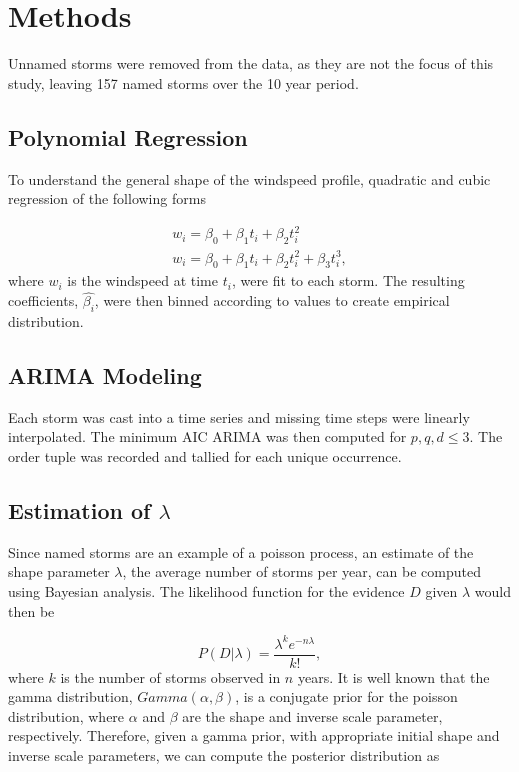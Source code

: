 \documentclass{article}
\begin{document}
	\section{Methods}	 
	 Unnamed storms were removed from the data, as they are not the focus of this study, leaving 157 named storms over the 10 year period. 

	\subsection{Polynomial Regression}
	To understand the general shape of the windspeed profile, quadratic and cubic regression of the following forms
	
		\begin{align}
			w_i = \beta_0 + \beta_1 t_i + \beta_2 t_i^2\\
			w_i = \beta_0 + \beta_1 t_i + \beta_2 t_i^2 + \beta_3 t_i^3,
		\end{align}
	where $w_i$ is the windspeed at time $t_i$, were fit to each storm. The resulting coefficients, $\hat{\beta_i}$, were then binned 
according to values to create empirical distribution.

	\subsection{ARIMA Modeling}
	Each storm was cast into a time series and missing time steps were linearly interpolated. The minimum AIC ARIMA was then computed for $p, q, d \le 3$. The order tuple was recorded and tallied for each unique occurrence.

	\subsection{Estimation of $\lambda$}
	Since named storms are an example of a poisson process, an estimate of the shape parameter $\lambda$, the average number of storms per year, can be computed using Bayesian analysis. The likelihood function for the evidence $D$ given $\lambda$ would then be
	
		\begin{equation}
			P(D | \lambda) = \frac{\lambda^k e^{-n \lambda}}{k!},
		\end{equation}
		where $k$ is the number of storms observed in $n$ years. It is well known that the gamma distribution, $Gamma(\alpha, \beta)$, is a conjugate prior for the poisson distribution, where $\alpha$ and $\beta$ are the shape and inverse scale parameter, respectively. Therefore, given a gamma prior, with appropriate initial shape and inverse scale parameters, we can compute the posterior distribution as
		
\end{document}
